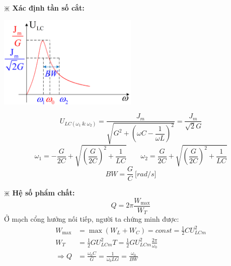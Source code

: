 \textbf{$\divideontimes$ Xác định tần số cắt:}
\begin{center}
    \includegraphics[width = 0.5\textwidth]{./image/73.png}
\end{center}
\begin{equation}
    U_{LC(\omega_1 \ \& \ \omega_2)} = \frac{J_m}{\sqrt{G^2 + \left(\omega C - \dfrac{1}{\omega L}\right)^2}} = \frac{J_m}{\sqrt{2}G}
\end{equation}
\begin{equation}
    \omega_1 = -\frac{G}{2C} + \sqrt{\left( \frac{G}{2C} \right)^2 + \frac{1}{LC}} \qquad \omega_2 = \frac{G}{2C} + \sqrt{\left( \frac{G}{2C} \right)^2 + \frac{1}{LC}}
\end{equation}
\begin{equation}
    BW = \frac{G}{C} \ \lbrack rad/s \rbrack
\end{equation}

\textbf{$\divideontimes$ Hệ số phẩm chất:}
\begin{equation*}
    Q = 2\pi \frac{W_{\max}}{W_T}
\end{equation*}
Ở mạch cổng hưởng nối tiếp, người ta chứng minh được:
\begin{equation}
    \begin{aligned}
        W_{\max} &= \max (W_L + W_C) = const = \frac{1}{2}CU^2_{LCm} \\
        W_T &= \frac{1}{2}GU^2_{LCm} T = \frac{1}{2}GU^2_{LCm} \frac{2\pi}{\omega_0} \\
        \Rightarrow Q &= \frac{\omega_0 C}{G} = \frac{1}{\omega_0 LG} = \frac{\omega_0}{BW}
    \end{aligned}
\end{equation}

